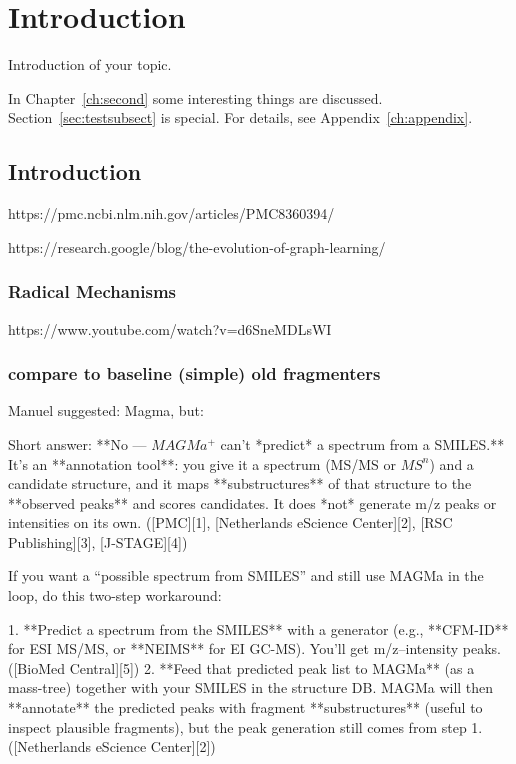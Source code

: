 \chapter{Introduction}
\label{ch:intro}

\noindent
Introduction of your topic.

In Chapter~\ref{ch:second} some interesting things are discussed. Section~\ref{sec:testsubsect} is special. For details, see Appendix~\ref{ch:appendix}.

\section{Introduction}

https://pmc.ncbi.nlm.nih.gov/articles/PMC8360394/

https://research.google/blog/the-evolution-of-graph-learning/

\subsection{Radical Mechanisms}
https://www.youtube.com/watch?v=d6SneMDLsWI

\subsection{compare to baseline (simple) old fragmenters}
Manuel suggested: Magma, but: 

Short answer: **No — $MAGMa^+$ can’t *predict* a spectrum from a SMILES.** It’s an **annotation tool**: you give it a spectrum (MS/MS or $MS^n$) and a candidate structure, and it maps **substructures** of that structure to the **observed peaks** and scores candidates. It does *not* generate m/z peaks or intensities on its own. ([PMC][1], [Netherlands eScience Center][2], [RSC Publishing][3], [J-STAGE][4])

If you want a “possible spectrum from SMILES” and still use MAGMa in the loop, do this two-step workaround:

1. **Predict a spectrum from the SMILES** with a generator (e.g., **CFM-ID** for ESI MS/MS, or **NEIMS** for EI GC-MS). You’ll get m/z–intensity peaks. ([BioMed Central][5])
2. **Feed that predicted peak list to MAGMa** (as a mass-tree) together with your SMILES in the structure DB. MAGMa will then **annotate** the predicted peaks with fragment **substructures** (useful to inspect plausible fragments), but the peak generation still comes from step 1. ([Netherlands eScience Center][2])

